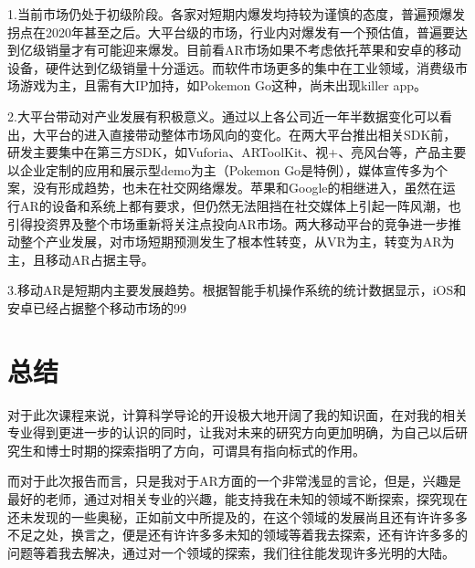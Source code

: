 \documentclass{article}
\begin{document}
1.当前市场仍处于初级阶段。各家对短期内爆发均持较为谨慎的态度，普遍预爆发拐点在2020年甚至之后。大平台级的市场，行业内对爆发有一个预估值，普遍要达到亿级销量才有可能迎来爆发。目前看AR市场如果不考虑依托苹果和安卓的移动设备，硬件达到亿级销量十分遥远。而软件市场更多的集中在工业领域，消费级市场游戏为主，且需有大IP加持，如Pokemon Go这种，尚未出现killer app。\par
2.大平台带动对产业发展有积极意义。通过以上各公司近一年半数据变化可以看出，大平台的进入直接带动整体市场风向的变化。在两大平台推出相关SDK前，研发主要集中在第三方SDK，如Vuforia、ARToolKit、视+、亮风台等，产品主要以企业定制的应用和展示型demo为主（Pokemon Go是特例），媒体宣传多为个案，没有形成趋势，也未在社交网络爆发。苹果和Google的相继进入，虽然在运行AR的设备和系统上都有要求，但仍然无法阻挡在社交媒体上引起一阵风潮，也引得投资界及整个市场重新将关注点投向AR市场。两大移动平台的竞争进一步推动整个产业发展，对市场短期预测发生了根本性转变，从VR为主，转变为AR为主，且移动AR占据主导。\par
3.移动AR是短期内主要发展趋势。根据智能手机操作系统的统计数据显示，iOS和安卓已经占据整个移动市场的99%




\maketitle

\section{总结}
对于此次课程来说，计算科学导论的开设极大地开阔了我的知识面，在对我的相关专业得到更进一步的认识的同时，让我对未来的研究方向更加明确，为自己以后研究生和博士时期的探索指明了方向，可谓具有指向标式的作用。\par
而对于此次报告而言，只是我对于AR方面的一个非常浅显的言论，但是，兴趣是最好的老师，通过对相关专业的兴趣，能支持我在未知的领域不断探索，探究现在还未发现的一些奥秘，正如前文中所提及的，在这个领域的发展尚且还有许许多多不足之处，换言之，便是还有许许多多未知的领域等着我去探索，还有许许多多的问题等着我去解决，通过对一个领域的探索，我们往往能发现许多光明的大陆。\par 
\end{document}
